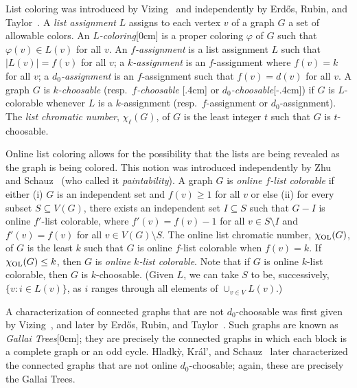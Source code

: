 \documentclass[12pt]{article}
\theoremstyle{plain}
\theoremstyle{definition}
\theoremstyle{remark}
\def\chil{{\chi_\ell}}
\def\chiol{\chi_{\rm{OL}}}
\newcommand{\aside}[1]{\marginnote{\scriptsize{#1}}[0cm]}
\newcommand{\aaside}[2]{\marginnote{\scriptsize{#1}}[#2]}
\begin{document}
List coloring was introduced by Vizing~\cite{vizing1976} and independently by
Erd\H{o}s,
Rubin, and Taylor~\cite{erdos1979choosability}.
A \emph{list assignment} $L$ assigns to each vertex $v$ of a graph $G$ a set of
allowable colors.  An \emph{$L$-coloring}\aside{$L$-coloring} is a proper
coloring $\varphi$ of $G$ such that $\varphi(v)\in L(v)$ for all $v$.  An
\emph{$f$-assignment} is a list assignment $L$ such that $|L(v)|=f(v)$ for all
$v$; a \emph{$k$-assignment} is an $f$-assignment where $f(v)=k$ for all
$v$; a \emph{$d_0$-assignment} is an $f$-assignment such that $f(v)=d(v)$ for
all $v$.
A graph $G$ is \emph{$k$-choosable} (resp.~\emph{$f$-choosable}
\aaside{$f$-choosable}{.4cm} or
\emph{$d_0$-choosable}\aaside{$d_0$-choosable}{-.4cm}) if $G$
is $L$-colorable whenever $L$ is a $k$-assignment (resp.~$f$-assignment or
$d_0$-assignment).  The \emph{list chromatic number}, $\chil(G)$, of $G$ is the
least integer $t$ such that $G$ is $t$-choosable.  

Online list coloring allows for the possibility that the lists are being
revealed as the graph is being colored.  This notion was introduced 
independently by Zhu~\cite{zhu2009online} and Schauz~\cite{schauz2009mr} (who
called it \emph{paintability}).  A graph $G$ is \emph{online $f$-list
colorable} if either (i) $G$ is an independent
set and $f(v)\ge 1$ for all $v$ or else (ii) for every subset $S\subseteq V(G)$,
there exists an independent set $I\subseteq S$ such that $G-I$ is online
$f'$-list colorable, where $f'(v)=f(v)-1$ for all $v\in S\setminus I$ and
$f'(v)=f(v)$ for all $v\in V(G)\setminus S$.  The online list chromatic number, 
$\chiol(G)$, of $G$ is the least $k$ such that $G$ is online $f$-list colorable
when $f(v)=k$.  If $\chiol(G)\le k$, then $G$ is \emph{online $k$-list
colorable}.  Note that if $G$ is online $k$-list colorable, then $G$ is
$k$-choosable. (Given $L$, we can take $S$ to be, successively, 
$\{v:i\in L(v)\}$, as $i$ ranges through all elements of $\cup_{v\in V}L(v)$.)

A characterization of connected graphs that are not $d_0$-choosable was first
given by Vizing~\cite{vizing1976}, and later by Erd\H{o}s, Rubin, and
Taylor~\cite{erdos1979choosability}.  Such graphs are known as \emph{Gallai
Trees}\aside{Gallai Trees};
they are precisely the connected graphs in which each block is a complete graph
or an odd cycle.  Hladk{\`y}, Kr{\'a}l', and Schauz~\cite{Hladky} later
characterized the connected
graphs that are not online $d_0$-choosable; again, these are precisely the
Gallai Trees.
\end{document}
